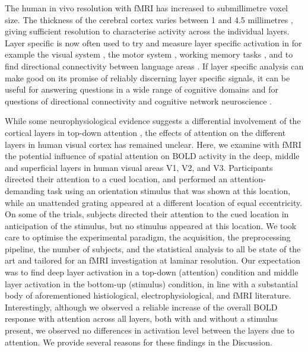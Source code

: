 \documentclass[9pt,lineno]{aperture}
\begin{document}
The human in vivo resolution with fMRI has increased to submillimetre voxel size. The thickness of the cerebral cortex varies between 1 and 4.5 millimetres \citep{Zilles1990,Fischl2000}, giving sufficient resolution to characterise activity across the individual layers. Layer specific is now often used to try and measure layer specific activation in for example the visual system \citep{Muckli2015,Kok2016,Lawrence2018,DeHollander2020}, the motor system \citep{Huber2018}, working memory tasks \citep{Finn2019}, and to find directional connectivity between language areas \citep{Sharoh2019}. If layer specific analysis can make good on its promise of reliably discerning layer specific signals, it can be useful for answering questions in a wide range of cognitive domains \citep{Lawrence2019} and for questions of directional connectivity and cognitive network neuroscience \citep{Huber2020}.

While some neurophysiological evidence suggests a differential involvement of the cortical layers in top-down attention \citep{Nandy2017, VanKerkoerle2017}, the effects of attention on the different layers in human visual cortex has remained unclear. Here, we examine with fMRI the potential influence of spatial attention on BOLD activity in the deep, middle and superficial layers in human visual areas V1, V2, and V3. Participants directed their attention to a cued location, and performed an attention-demanding task using an orientation stimulus that was shown at this location, while an unattended grating appeared at a different location of equal eccentricity. On some of the trials, subjects directed their attention to the cued location in anticipation of the stimulus, but no stimulus appeared at this location. 
We took care to optimise the experimental paradigm, the acquisition, the preprocessing pipeline, the number of subjects, and the statistical analysis to all be state of the art and tailored for an fMRI investigation at laminar resolution. Our expectation was to find deep layer activation in a top-down (attention) condition and middle layer activation in the bottom-up (stimulus) condition, in line with a substantial body of aforementioned histiological, electrophysiological, and fMRI literature.
Interestingly, although we observed a reliable increase of the overall BOLD response with attention across all layers, both with and without a stimulus present, we observed no differences in activation level between the layers due to attention. We provide several reasons for these findings in the Discussion.
\end{document}
